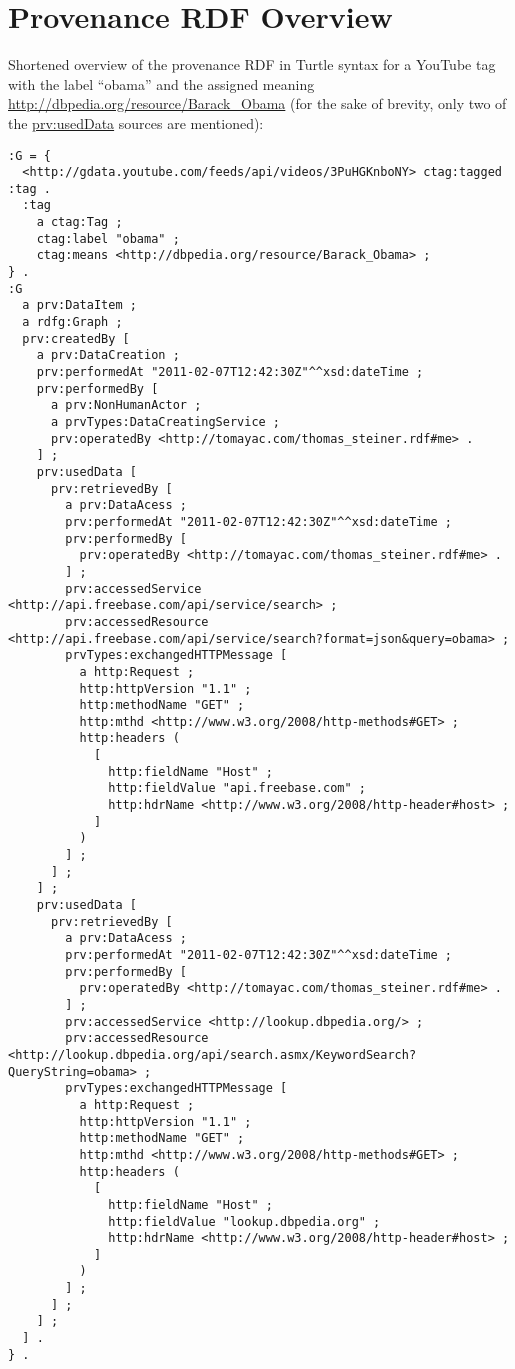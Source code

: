 \documentclass{acm_proc_article-sp}
\begin{document}
\section{Provenance RDF Overview}                                           \label{sec:appendix}
Shortened overview of the provenance RDF in Turtle syntax for a YouTube tag with the label ``obama'' and the assigned
meaning \url{http://dbpedia.org/resource/Barack_Obama} (for the sake of brevity, only two of the \url{prv:usedData}
sources are mentioned):
\begin{lstlisting}
:G = {
  <http://gdata.youtube.com/feeds/api/videos/3PuHGKnboNY> ctag:tagged :tag .
  :tag
    a ctag:Tag ;
    ctag:label "obama" ;
    ctag:means <http://dbpedia.org/resource/Barack_Obama> ;
} .
:G
  a prv:DataItem ;
  a rdfg:Graph ;
  prv:createdBy [
    a prv:DataCreation ;
    prv:performedAt "2011-02-07T12:42:30Z"^^xsd:dateTime ;
    prv:performedBy [
      a prv:NonHumanActor ;
      a prvTypes:DataCreatingService ;
      prv:operatedBy <http://tomayac.com/thomas_steiner.rdf#me> .
    ] ;
    prv:usedData [
      prv:retrievedBy [
        a prv:DataAcess ;
        prv:performedAt "2011-02-07T12:42:30Z"^^xsd:dateTime ;
        prv:performedBy [
          prv:operatedBy <http://tomayac.com/thomas_steiner.rdf#me> .
        ] ;
        prv:accessedService <http://api.freebase.com/api/service/search> ;
        prv:accessedResource <http://api.freebase.com/api/service/search?format=json&query=obama> ;
        prvTypes:exchangedHTTPMessage [
          a http:Request ;
          http:httpVersion "1.1" ;
          http:methodName "GET" ;
          http:mthd <http://www.w3.org/2008/http-methods#GET> ;
          http:headers (
            [
              http:fieldName "Host" ;
              http:fieldValue "api.freebase.com" ;
              http:hdrName <http://www.w3.org/2008/http-header#host> ;
            ]
          )
        ] ;
      ] ;
    ] ;
    prv:usedData [
      prv:retrievedBy [
        a prv:DataAcess ;
        prv:performedAt "2011-02-07T12:42:30Z"^^xsd:dateTime ;
        prv:performedBy [
          prv:operatedBy <http://tomayac.com/thomas_steiner.rdf#me> .
        ] ;
        prv:accessedService <http://lookup.dbpedia.org/> ;
        prv:accessedResource <http://lookup.dbpedia.org/api/search.asmx/KeywordSearch?QueryString=obama> ;
        prvTypes:exchangedHTTPMessage [
          a http:Request ;
          http:httpVersion "1.1" ;
          http:methodName "GET" ;
          http:mthd <http://www.w3.org/2008/http-methods#GET> ;
          http:headers (
            [
              http:fieldName "Host" ;
              http:fieldValue "lookup.dbpedia.org" ;
              http:hdrName <http://www.w3.org/2008/http-header#host> ;
            ]
          )
        ] ;
      ] ;
    ] ;
  ] .
} .
\end{lstlisting}

\balancecolumns
\end{document}
